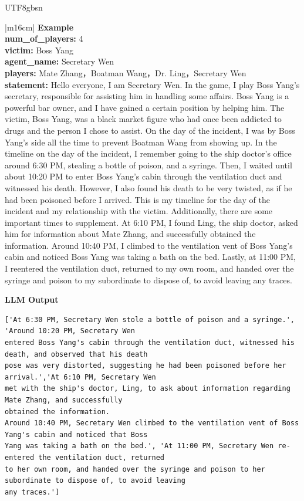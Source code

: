 \documentclass[11pt]{article}
\begin{document}
{\begin{CJK}{UTF8}{gbsn}
\begin{table}[ht!]
\begin{minipage}[t]{\linewidth}
\begin{tabular}{|m{16cm}|}
\hline
{}  \textbf{Example}  \\
 \textbf{  num\_of\_players:} \small4\\
  \textbf{  victim:} \small Boss Yang\\
 \textbf{  agent\_name:} \small Secretary Wen\\
  \textbf{  players:} \small Mate Zhang，Boatman Wang，Dr. Ling，Secretary Wen\\
  \textbf{  statement:} \small Hello everyone, I am Secretary Wen. In the game, I play Boss Yang's secretary, responsible for assisting him in handling some affairs. Boss Yang is a powerful bar owner, and I have gained a certain position by helping him. The victim, Boss Yang, was a black market figure who had once been addicted to drugs and the person I chose to assist. On the day of the incident, I was by Boss Yang's side all the time to prevent Boatman Wang from showing up. In the timeline on the day of the incident, I remember going to the ship doctor's office around 6:30 PM, stealing a bottle of poison, and a syringe. Then, I waited until about 10:20 PM to enter Boss Yang's cabin through the ventilation duct and witnessed his death. However, I also found his death to be very twisted, as if he had been poisoned before I arrived. This is my timeline for the day of the incident and my relationship with the victim. Additionally, there are some important times to supplement.  At 6:10 PM, I found Ling, the ship doctor, asked him for information about Mate Zhang, and successfully obtained the information. Around 10:40 PM, I climbed to the ventilation vent of Boss Yang's cabin and noticed Boss Yang was taking a bath on the bed. Lastly, at 11:00 PM, I reentered the ventilation duct, returned to my own room, and handed over the syringe and poison to my subordinate to dispose of, to avoid leaving any traces.\\
\hline

  \textbf{LLM Output}  \\
\hline
\begin{minipage}[t]{\linewidth}
\small\begin{verbatim}
['At 6:30 PM, Secretary Wen stole a bottle of poison and a syringe.', 'Around 10:20 PM, Secretary Wen 
entered Boss Yang's cabin through the ventilation duct, witnessed his death, and observed that his death
pose was very distorted, suggesting he had been poisoned before her arrival.','At 6:10 PM, Secretary Wen
met with the ship's doctor, Ling, to ask about information regarding Mate Zhang, and successfully
obtained the information.
Around 10:40 PM, Secretary Wen climbed to the ventilation vent of Boss Yang's cabin and noticed that Boss
Yang was taking a bath on the bed.', 'At 11:00 PM, Secretary Wen re-entered the ventilation duct, returned
to her own room, and handed over the syringe and poison to her subordinate to dispose of, to avoid leaving
any traces.']
\end{verbatim}
\end{minipage} \\
\hline




\end{tabular}
\end{minipage}
\end{table}
\end{CJK}}
\end{document}
